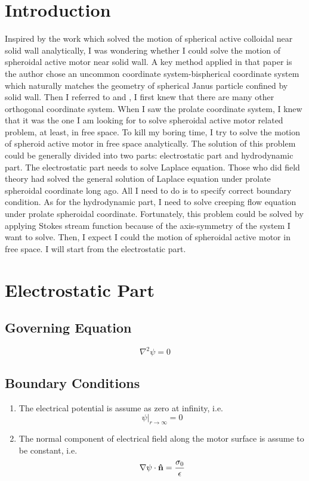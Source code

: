 \documentclass[fontsize=11pt, %
                             paper=a4, %
                             twoside, %
                             captions=tableheading,
                             index=totoc,
                             hyperref]{labbook}
\begin{document}
\begin{addmargin}[4cm]{0cm}
\section{Introduction}
Inspired by the work\cite{MozaffariSharifi-MoodKoplikEtAl2016}\cite{LeeLeal1980} which solved the motion of spherical active colloidal near solid wall analytically, I was wondering whether I could solve the motion of spheroidal active motor near solid wall. A key method applied in that paper is the author chose an uncommon coordinate system-bispherical coordinate system which naturally matches the geometry of spherical Janus particle confined by solid wall. Then I referred to \cite{MorseFeshbach1953} and \cite{MoonSpencer1988}, I first knew that there are many other orthogonal coordinate system. When I saw the prolate coordinate system, I knew that it was the one I am looking for to solve spheroidal active motor related problem, at least, in free space. To kill my boring time, I try to solve the motion of spheroid active motor in free space analytically. The solution of this problem could be generally divided into two parts: electrostatic part and hydrodynamic part. The electrostatic part needs to solve Laplace equation. Those who did field theory had solved the general solution of Laplace equation under prolate spheroidal coordinate long ago. All I need to do is to specify correct boundary condition. As for the hydrodynamic part, I need to solve creeping flow equation under prolate spheroidal coordinate. Fortunately, this problem could be solved by applying Stokes stream function\cite{HappelBrenner1983} because of the axis-symmetry of the system I want to solve. Then, I expect I could the motion of spheroidal active motor in free space. I will start from the electrostatic part.
\section{Electrostatic Part}
\subsection{Governing Equation}
\begin{equation}
\nabla^2\psi=0
\end{equation}
\subsection{Boundary Conditions}
\begin{enumerate}
\item
The electrical potential is assume as zero at infinity, i.e.
\begin{equation}
\psi|_{r\rightarrow\infty}=0
\end{equation}
\item
The normal component of electrical field along the motor surface is assume to be constant\cite{Kline2006}, i.e.
\begin{equation}
\nabla\psi \cdot \mathbf{\hat{n}} = \frac{\sigma_0}{\epsilon}
\end{equation}
\end{enumerate}

\end{addmargin}
\end{document}
